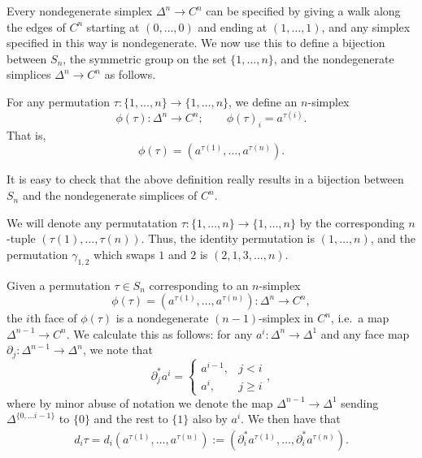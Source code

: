 \documentclass[main.tex]{subfiles}
\begin{document}
Every nondegenerate simplex $\Delta^{n} \to C^{n}$ can be specified by giving a walk along the edges of $C^{n}$ starting at $(0, \ldots, 0)$ and ending at $(1, \ldots, 1)$, and any simplex specified in this way is nondegenerate. We now use this to define a bijection between $S_{n}$, the symmetric group on the set $\{1, \ldots, n\}$, and the nondegenerate simplices $\Delta^{n} \to C^{n}$ as follows.

\begin{definition}
  For any permutation $\tau\colon \{1, \ldots, n\} \to \{1, \ldots, n\}$, we define an $n$-simplex
  \begin{equation*}
    \phi(\tau)\colon \Delta^{n} \to C^{n};\qquad \phi(\tau)_{i} = a^{\tau(i)}.
  \end{equation*}
  That is,
  \begin{equation*}
    \phi(\tau) = (a^{\tau(1)}, \ldots, a^{\tau(n)}).
  \end{equation*}
\end{definition}

\begin{note}
  It is easy to check that the above definition really results in a bijection between $S_{n}$ and the nondegenerate simplices of $C^{n}$.
\end{note}

\begin{notation}
  We will denote any permutatation $\tau\colon \{1, \ldots, n\} \to \{1, \ldots, n\}$ by the corresponding $n$-tuple $(\tau(1), \ldots, \tau(n))$. Thus, the identity permutation is $(1, \ldots, n)$, and the permutation $\gamma_{1,2}$ which swaps $1$ and $2$ is $(2, 1, 3, \ldots, n)$.
\end{notation}

Given a permutation $\tau \in S_{n}$ corresponding to an $n$-simplex
\begin{equation*}
  \phi(\tau) = (a^{\tau(1)}, \ldots, a^{\tau(n)})\colon \Delta^{n} \to C^{n},
\end{equation*}
the $i$th face of $\phi(\tau)$ is a nondegenerate $(n-1)$-simplex in $C^{n}$, i.e.\ a map $\Delta^{n-1} \to C^{n}$. We calculate this as follows: for any $a^{i}\colon \Delta^{n} \to \Delta^{1}$ and any face map $\partial_{j}\colon \Delta^{n-1} \to \Delta^{n}$, we note that
\begin{equation*}
  \partial_{j}^{*}a^{i} =
  \begin{cases}
    a^{i-1}, & j < i \\
    a^{i}, & j \geq i
  \end{cases},
\end{equation*}
where by minor abuse of notation we denote the map $\Delta^{n-1} \to \Delta^{1}$ sending $\Delta^{\{0, \ldots i-1\}}$ to $\{0\}$ and the rest to $\{1\}$ also by $a^{i}$. We then have that
\begin{gather*}
  \label{eq:simplicial_identity_for_cubes}
  d_{i}\tau = d_{i}(a^{\tau(1)}, \ldots, a^{\tau(n)}) := (\partial_{i}^{*} a^{\tau(1)}, \ldots, \partial_{i}^{*} a^{\tau(n)}).
\end{gather*}
\end{document}
